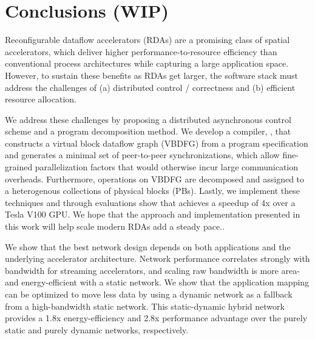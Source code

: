\chapter{Conclusions (WIP)} \label{sec:conclusion}

Reconfigurable dataflow accelerators (RDAs) are a promising class of spatial accelerators, which deliver higher performance-to-resource efficiency than conventional process architectures while capturing a large application space.
However, to sustain these benefits as RDAs get larger, the software stack must address the challenges of (a) distributed control / correctness and (b) efficient resource allocation.

We address these challenges by proposing a distributed asynchronous control scheme and a program decomposition method. 
We develop a compiler, \name{}, that constructs a virtual block dataflow graph (VBDFG) from a program specification and generates a minimal set of peer-to-peer synchronizations, which allow fine-grained parallelization factors that would otherwise incur large communication overheads.
Furthermore, operations on VBDFG are decomposed and assigned to a heterogenous collections of physical blocks (PBs). 
Lastly, we implement these techniques and through evaluations show that \name{} achieves a speedup of 4x over a Tesla V100 GPU.
We hope that the approach and implementation presented in this work will help scale modern RDAs add a steady pace..

We show that the best network design depends on both applications and the underlying accelerator architecture.
Network performance correlates strongly with bandwidth for streaming accelerators, and scaling raw bandwidth is more area- and energy-efficient with a static network.
We show that the application mapping can be optimized to move less data by using a dynamic network as a fallback from a high-bandwidth static network.
This static-dynamic hybrid network provides a 1.8x energy-efficiency and
2.8x performance advantage over the purely static and purely dynamic networks, respectively.


